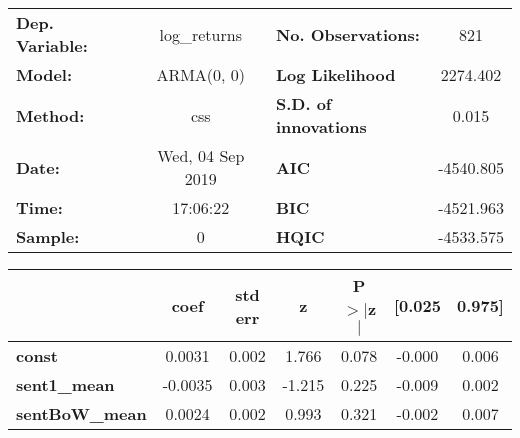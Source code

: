 \begin{center}
\begin{tabular}{lclc}
\toprule
\textbf{Dep. Variable:} &   log\_returns   & \textbf{  No. Observations:  } &    821      \\
\textbf{Model:}         &    ARMA(0, 0)    & \textbf{  Log Likelihood     } &  2274.402   \\
\textbf{Method:}        &       css        & \textbf{  S.D. of innovations} &   0.015     \\
\textbf{Date:}          & Wed, 04 Sep 2019 & \textbf{  AIC                } & -4540.805   \\
\textbf{Time:}          &     17:06:22     & \textbf{  BIC                } & -4521.963   \\
\textbf{Sample:}        &        0         & \textbf{  HQIC               } & -4533.575   \\
\bottomrule
\end{tabular}
\begin{tabular}{lcccccc}
                       & \textbf{coef} & \textbf{std err} & \textbf{z} & \textbf{P$> |$z$|$} & \textbf{[0.025} & \textbf{0.975]}  \\
\midrule
\textbf{const}         &       0.0031  &        0.002     &     1.766  &         0.078        &       -0.000    &        0.006     \\
\textbf{sent1\_mean}   &      -0.0035  &        0.003     &    -1.215  &         0.225        &       -0.009    &        0.002     \\
\textbf{sentBoW\_mean} &       0.0024  &        0.002     &     0.993  &         0.321        &       -0.002    &        0.007     \\
\bottomrule
\end{tabular}
\end{center}
